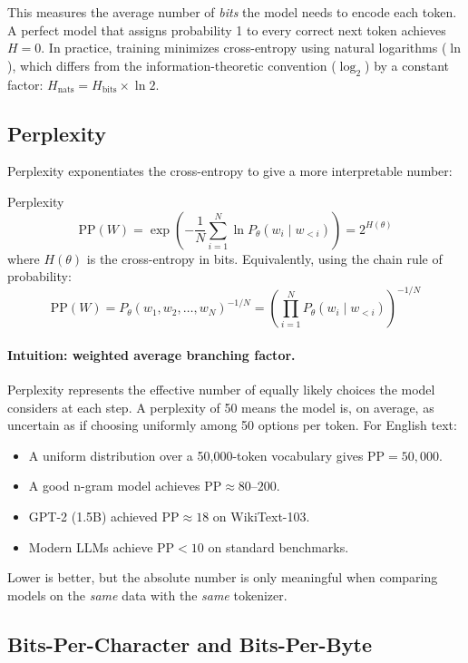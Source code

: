 This measures the average number of \emph{bits} the model needs to encode each
token.  A perfect model that assigns probability 1 to every correct next token
achieves $H = 0$.  In practice, training minimizes cross-entropy using natural
logarithms ($\ln$), which differs from the information-theoretic convention
($\log_2$) by a constant factor: $H_{\text{nats}} = H_{\text{bits}} \times \ln 2$.

\subsection{Perplexity}

Perplexity exponentiates the cross-entropy to give a more interpretable number:

\begin{mathresult}{Perplexity}
\[
    \text{PP}(W) = \exp\!\left(-\frac{1}{N}\sum_{i=1}^{N}\ln P_\theta(w_i \mid w_{<i})\right)
    = 2^{H(\theta)}
\]
where $H(\theta)$ is the cross-entropy in bits.  Equivalently, using the chain rule
of probability:
\[
    \text{PP}(W) = P_\theta(w_1, w_2, \ldots, w_N)^{-1/N}
    = \left(\prod_{i=1}^{N} P_\theta(w_i \mid w_{<i})\right)^{-1/N}
\]
\end{mathresult}

\paragraph{Intuition: weighted average branching factor.}
Perplexity represents the effective number of equally likely choices the model
considers at each step.  A perplexity of 50 means the model is, on average, as
uncertain as if choosing uniformly among 50 options per token.  For English text:
\begin{itemize}
    \item A uniform distribution over a 50,000-token vocabulary gives
          $\text{PP} = 50{,}000$.
    \item A good n-gram model achieves $\text{PP} \approx 80\text{--}200$.
    \item GPT-2 (1.5B) achieved $\text{PP} \approx 18$ on WikiText-103.
    \item Modern LLMs achieve $\text{PP} < 10$ on standard benchmarks.
\end{itemize}
Lower is better, but the absolute number is only meaningful when comparing models
on the \emph{same} data with the \emph{same} tokenizer.

\subsection{Bits-Per-Character and Bits-Per-Byte}
\label{sec:bpc}

